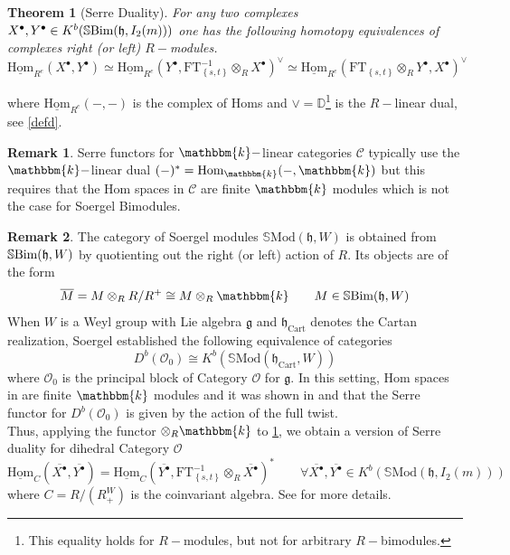 \documentclass[10pt]{article}
\newtheorem{theorem}{Theorem}
\numberwithin{theorem}{section}
\theoremstyle{definition}
\newtheorem*{remark}{Remark}
\newcommand{\kb}{\mathbbm{k}}
\renewcommand{\hom}{\mathrm{Hom}}
\newcommand{\gf}{\mathfrak{g}}
\newcommand{\uhom}{\underline{\mathrm{Hom}}}
\newcommand{\Cc}{\mathcal{C}}
\newcommand{\Oc}{\mathcal{O}}
\newcommand{\hf}{\mathfrak{h}}
\newcommand{\Db}{\mathbb{D}}
\newcommand{\sbim}{\mathbb{S}\textnormal{Bim}}
\newcommand{\set}[1]{\left \{ #1 \right \}}
\newcommand{\0}{\ \raisebox{-2ex}{\begin{tikzpicture}[xscale=0.25,yscale=0.3,thick,baseline]
 \draw (0,0) -- (0,3); 
\end{tikzpicture}}}
\renewcommand{\1}{\ \raisebox{-2ex}{\begin{tikzpicture}[xscale=0.25,yscale=0.3,thick,baseline]
 \draw (0,0) -- (0,1);
 \draw (0,2) -- (0,3);
 \node[dot] at (0,1) {};
  \node[dot] at (0,2) {};
\end{tikzpicture}}}
\begin{document}
\begin{theorem}[Serre Duality]
\label{maintheorem}
    For any two complexes $X^\bullet, Y^\bullet \in K^b(\sbim(\hf, I_2(m)))$ one has the following homotopy equivalences of complexes right (or left) $R-$modules.
\[
\uhom_{R^e}(X^\bullet,Y^\bullet) \simeq \uhom_{R^e}(Y^\bullet, \mathrm{FT}_{\set{s,t}}^{-1} \otimes_R X^\bullet)^\vee \simeq \uhom_{R^e}(\mathrm{FT}_{\set{s,t}} \otimes_R Y^\bullet, X^\bullet)^\vee 
\]
\end{theorem}
where $\uhom_{R^e}(-,-)$ is the complex of Homs and $\vee=\Db$\footnote{This equality holds for $R-$modules, but not for arbitrary $R-$bimodules.} is the $R-$linear dual, see \cref{defd}. 

\begin{remark}
    Serre functors for $\kb-$linear categories $\Cc$ typically use the $\kb-$linear dual $(-)^*=\hom_\kb(-, \kb)$ but this requires that the $\hom$ spaces in $\Cc$ are finite $\kb$ modules which is not the case for Soergel Bimodules.  
\end{remark}

\begin{remark}
The category of Soergel modules $\mathbb{S}\mathrm{Mod}(\hf, W)$ is obtained from $\sbim(\hf, W)$ by quotienting out the right (or left) action of $R$. Its objects are of the form
\[ \overline{M}= M\otimes_R R/R^+\cong M\otimes_R \kb \qquad M\in  \sbim(\hf, W)  \]
When $W$ is a Weyl group with Lie algebra $\gf$ and $\hf_{\mathrm{Cart}}$ denotes the Cartan realization, Soergel \cite{Soe90} established the following equivalence of categories $$D^b(\Oc_0)\cong K^b( \mathbb{S}\mathrm{Mod}(\hf_{\mathrm{Cart}}, W))$$
where $\Oc_0$ is the principal block of Category $\Oc$ for $\gf$.  In this setting, $\hom$ spaces in are finite $\kb$ modules and it was shown in \cite{bbm04} and \cite{MS08} that the Serre functor for $D^b(\Oc_0)$ is given by the action of the full twist. \\

Thus, applying the functor $\otimes_R \kb$ to \cref{maintheorem}, we obtain a version of Serre duality for dihedral Category $\Oc$
\[
\uhom_{C}(\overline{X^\bullet},\overline{Y^\bullet}) = \uhom_{C}(\overline{Y^\bullet}, \mathrm{FT}_{\set{s,t}}^{-1} \otimes_R \overline{X^\bullet})^*  \qquad \forall \overline{X^\bullet}, \overline{Y^\bullet}\in K^b( \mathbb{S}\mathrm{Mod}(\hf, I_2(m)))
\] 
where $C=R/(R^W_+)$ is the coinvariant algebra. See \cite[Section 6.4]{GHMN19} for more details. 
\end{remark}
\end{document}
